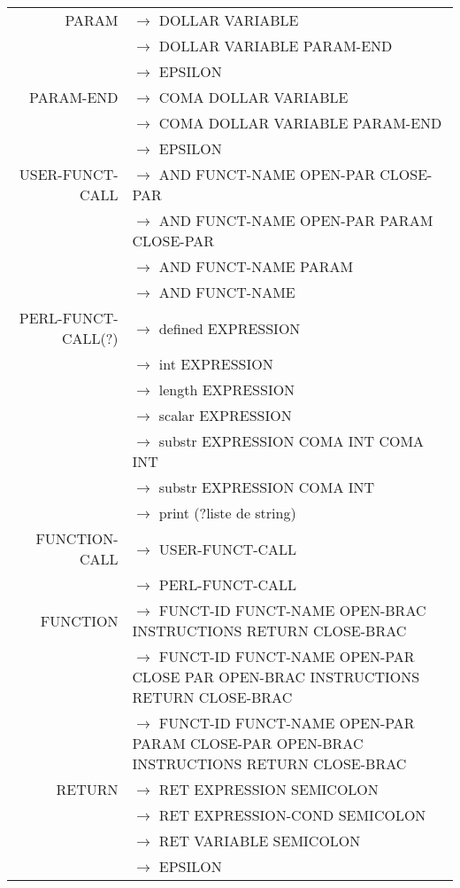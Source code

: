 \documentclass[a4paper,10pt]{article}
\begin{document}
\begin{tabular}{rl}
					
					
PARAM				& $\rightarrow$ DOLLAR VARIABLE \\
					& $\rightarrow$ DOLLAR VARIABLE PARAM-END\\
					& $\rightarrow$ EPSILON \\
PARAM-END			& $\rightarrow$ COMA DOLLAR VARIABLE \\ 
					& $\rightarrow$ COMA DOLLAR VARIABLE PARAM-END\\ 
					& $\rightarrow$ EPSILON \\



USER-FUNCT-CALL		& $\rightarrow$ AND FUNCT-NAME OPEN-PAR CLOSE-PAR\\ 
					& $\rightarrow$ AND FUNCT-NAME OPEN-PAR PARAM CLOSE-PAR\\ 
					& $\rightarrow$ AND FUNCT-NAME PARAM\\ 
					& $\rightarrow$ AND FUNCT-NAME\\ 
					
					
					
					
PERL-FUNCT-CALL(?)	& $\rightarrow$ defined EXPRESSION \\
					& $\rightarrow$ int EXPRESSION \\
					& $\rightarrow$ length EXPRESSION \\ 
					& $\rightarrow$ scalar EXPRESSION \\
					& $\rightarrow$ substr EXPRESSION COMA INT COMA INT \\
					& $\rightarrow$ substr EXPRESSION COMA INT  \\
					& $\rightarrow$ print (?liste de string) \\ 
					
					
FUNCTION-CALL		& $\rightarrow$ USER-FUNCT-CALL \\
					& $\rightarrow$ PERL-FUNCT-CALL \\


FUNCTION			& $\rightarrow$ FUNCT-ID FUNCT-NAME OPEN-BRAC INSTRUCTIONS RETURN CLOSE-BRAC \\
					& $\rightarrow$ FUNCT-ID FUNCT-NAME OPEN-PAR CLOSE PAR OPEN-BRAC INSTRUCTIONS RETURN CLOSE-BRAC \\
					& $\rightarrow$ FUNCT-ID FUNCT-NAME OPEN-PAR PARAM CLOSE-PAR OPEN-BRAC INSTRUCTIONS RETURN CLOSE-BRAC \\

RETURN				& $\rightarrow$ RET EXPRESSION SEMICOLON\\
					& $\rightarrow$ RET EXPRESSION-COND SEMICOLON\\
					& $\rightarrow$ RET VARIABLE SEMICOLON\\
					& $\rightarrow$ EPSILON \\
					

\end{tabular}
\end{document}
